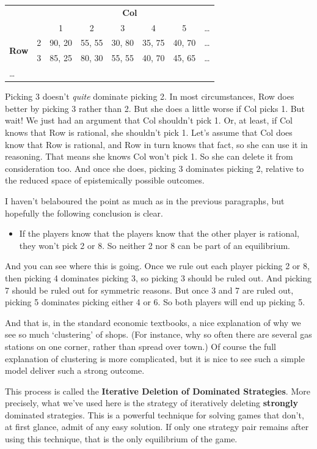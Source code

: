 \documentclass[openany]{book}
\begin{document}
\begin{center}
\begin{tabular}{l r | c c c c c c}
& & \multicolumn{6}{c}{\textbf{Col}} \\
& & 1 & 2 & 3 & 4 & 5 & \dots  \\ \hline
\multirow{2}{*}{\textbf{Row}} & 2 & 90, 20 & 55, 55 & 30, 80 & 35, 75 & 40, 70 &  \dots \\
& 3 & 85, 25 & 80, 30 & 55, 55 & 40, 70 & 45, 65 & \dots \\
\dots 
\end{tabular}
\end{center}
Picking 3 doesn't \textit{quite} dominate picking 2. In most circumstances, Row does better by picking 3 rather than 2. But she does a little worse if Col picks 1. But wait! We just had an argument that Col shouldn't pick 1. Or, at least, if Col knows that Row is rational, she shouldn't pick 1. Let's assume that Col does know that Row is rational, and Row in turn knows that fact, so she can use it in reasoning. That means she knows Col won't pick 1. So she can delete it from consideration too. And once she does, picking 3 dominates picking 2, relative to the reduced space of epistemically possible outcomes.

I haven't belaboured the point as much as in the previous paragraphs, but hopefully the following conclusion is clear.

\begin{itemize}
\item If the players know that the players know that the other player is rational, they won't pick 2 or 8. So neither 2 nor 8 can be part of an equilibrium.
\end{itemize}
And you can see where this is going. Once we rule out each player picking 2 or 8, then picking 4 dominates picking 3, so picking 3 should be ruled out. And picking 7 should be ruled out for symmetric reasons. But once 3 and 7 are ruled out, picking 5 dominates picking either 4 or 6. So both players will end up picking 5.

And that is, in the standard economic textbooks, a nice explanation of why we see so much `clustering' of shops. (For instance, why so often there are several gas stations on one corner, rather than spread over town.) Of course the full explanation of clustering is more complicated, but it is nice to see such a simple model deliver such a strong outcome. 

This process is called the \textbf{Iterative Deletion of Dominated Strategies}. More precisely, what we've used here is the strategy of iteratively deleting \textbf{strongly} dominated strategies. This is a powerful technique for solving games that don't, at first glance, admit of any easy solution. If only one strategy pair remains after using this technique, that is the only equilibrium of the game.
\end{document}
